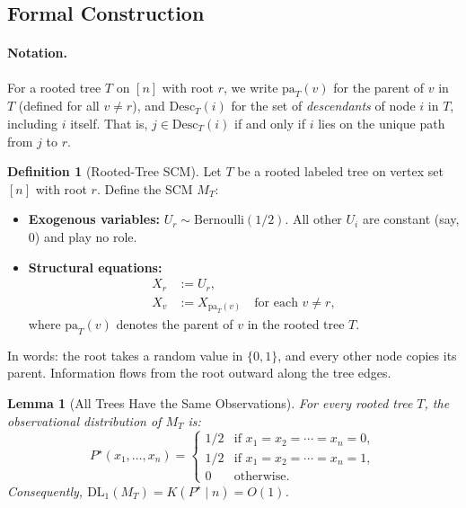 \documentclass{article}
\theoremstyle{plain}
\newtheorem{lemma}[theorem]{Lemma}
\theoremstyle{definition}
\newtheorem{definition}[theorem]{Definition}
\newcommand{\DL}{\mathrm{DL}}
\newcommand{\pa}{\mathrm{pa}}
\newcommand{\Desc}{\mathrm{Desc}}
\begin{document}
\subsection*{Formal Construction}

\paragraph{Notation.} For a rooted tree $T$ on $[n]$ with root $r$, we write $\pa_T(v)$ for the parent of $v$ in $T$ (defined for all $v \neq r$), and $\Desc_T(i)$ for the set of \emph{descendants} of node $i$ in $T$, including $i$ itself. That is, $j \in \Desc_T(i)$ if and only if $i$ lies on the unique path from $j$ to $r$.

\begin{definition}[Rooted-Tree SCM]
\label{def:tree-scm}
Let $T$ be a rooted labeled tree on vertex set $[n]$ with root $r$. Define the SCM $M_T$:
\begin{itemize}
    \item \textbf{Exogenous variables:} $U_r \sim \mathrm{Bernoulli}(1/2)$. All other $U_i$ are constant (say, $0$) and play no role.
    \item \textbf{Structural equations:}
    \begin{align*}
        X_r &:= U_r, \\
        X_v &:= X_{\pa_T(v)} \quad \text{for each } v \neq r,
    \end{align*}
    where $\pa_T(v)$ denotes the parent of $v$ in the rooted tree $T$.
\end{itemize}
\end{definition}

In words: the root takes a random value in $\{0,1\}$, and every other node copies its parent. Information flows from the root outward along the tree edges.

\begin{lemma}[All Trees Have the Same Observations]
\label{lem:tree-obs}
For every rooted tree $T$, the observational distribution of $M_T$ is:
\[
P^\star(x_1, \ldots, x_n) = \begin{cases}
1/2 & \text{if } x_1 = x_2 = \cdots = x_n = 0, \\
1/2 & \text{if } x_1 = x_2 = \cdots = x_n = 1, \\
0 & \text{otherwise}.
\end{cases}
\]
Consequently, $\DL_1(M_T) = K(P^\star \mid n) = O(1)$.
\end{lemma}
\end{document}
